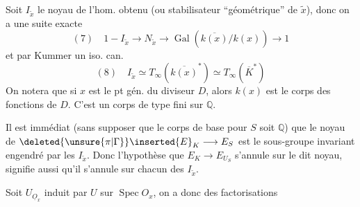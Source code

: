 Soit $I_{\widetilde x}$ le noyau de l'hom. obtenu
(ou stabilisateur ``géométrique'' de $\widetilde x$), donc
on a une suite exacte
\[
(7)\quad 1-I_{\widetilde x}\longrightarrow N_{\widetilde x}\longrightarrow\operatorname{Gal}(\overline{k(x)}/k(x))\longrightarrow1
\]
et par Kummer un iso. can.
\[
(8)\quad I_{\widetilde x}\simeq T_\infty(\overline{k(x)}^*)\simeq T_\infty(\overline K^*)
\]
On notera que si $x$ est le pt gén. du
diviseur $D$, alors $k(x)$ est le corps des
fonctions de $D$. C'est un corps de
type fini sur $\mathbb Q$.

Il est immédiat (sans supposer que le
corps de base pour $S$ soit $\mathbb Q$) que
le noyau de $\deleted{\unsure{\pi|\Gamma}}\inserted{E}_K\longrightarrow E_S$ est le sous-groupe
invariant engendré par les $I_{\widetilde x}$. Donc
l'hypothèse que $E_K\longrightarrow E_{U_S}$ s'annule
sur le dit noyau, signifie aussi qu'il
s'annule sur chacun des $I_{\widetilde x}$.

Soit  $U_{\underline O_x}$ induit par $U$ sur
$\operatorname{Spec}O_x$, on a donc des factorisations
